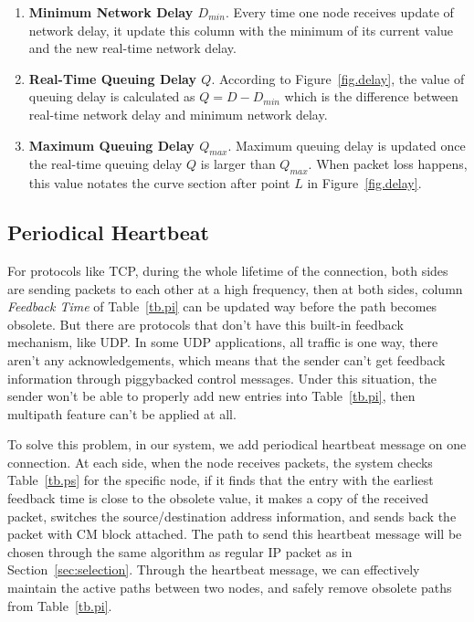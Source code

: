\begin{enumerate}
\item \textbf{Minimum Network Delay $D_{min}$}. Every time one node receives update of network delay, it update this column with the minimum of its current value and the new real-time network delay.
\item \textbf{Real-Time Queuing Delay $Q$}. According to Figure~\ref{fig.delay}, the value of queuing delay is calculated as $Q=D-D_{min}$ which is the difference between real-time network delay and minimum network delay.
\item \textbf{Maximum Queuing Delay $Q_{max}$}. Maximum queuing delay is updated once the real-time queuing delay $Q$ is larger than $Q_{max}$. When packet loss happens, this value notates the curve section after point $L$ in Figure~\ref{fig.delay}.
\end{enumerate}


\subsection{Periodical Heartbeat}

For protocols like TCP, during the whole lifetime of the connection, both sides are sending packets to each other at a high frequency, then at both sides, column \emph{Feedback Time} of Table~\ref{tb.pi} can be updated way before the path becomes obsolete. But there are protocols that don't have this built-in feedback mechanism, like UDP. In some UDP applications, all traffic is one way, there aren't any acknowledgements, which means that the sender can't get feedback information through piggybacked control messages. Under this situation, the sender won't be able to properly add new entries into Table~\ref{tb.pi}, then multipath feature can't be applied at all. 

To solve this problem, in our system, we add periodical heartbeat message on one connection. At each side, when the node receives packets, the system checks Table~\ref{tb.ps} for the specific node, if it finds that the entry with the earliest feedback time is close to the obsolete value, it makes a copy of the received packet, switches the source/destination address information, and sends back the packet with CM block attached. The path to send this heartbeat message will be chosen through the same algorithm as regular IP packet as in Section~\ref{sec:selection}. Through the heartbeat message, we can effectively maintain the active paths between two nodes, and safely remove obsolete paths from Table~\ref{tb.pi}. 


